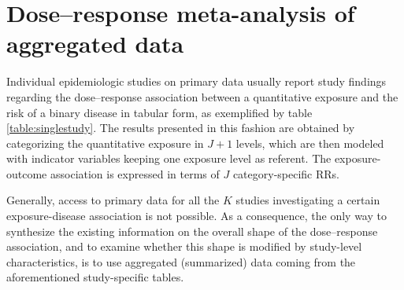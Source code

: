 \section{Dose--response meta-analysis of aggregated data}
\label{sec:drma}

Individual epidemiologic studies on primary data usually report study findings regarding the dose--response association between a quantitative exposure and the risk of a binary disease in tabular form, as exemplified by table \ref{table:singlestudy}. The results presented in this fashion are obtained by categorizing the quantitative exposure in $J+1$ levels, which are then modeled with indicator variables keeping one exposure level as referent. The exposure-outcome association is expressed in terms of $J$ category-specific RRs.

Generally, access to primary data for all the $K$ studies investigating a certain exposure-disease association is not possible. As a consequence, the only way to synthesize the existing information on the overall shape of the dose--response association, and to examine whether this shape is modified by study-level characteristics, is to use aggregated (summarized) data coming from the aforementioned study-specific tables.

